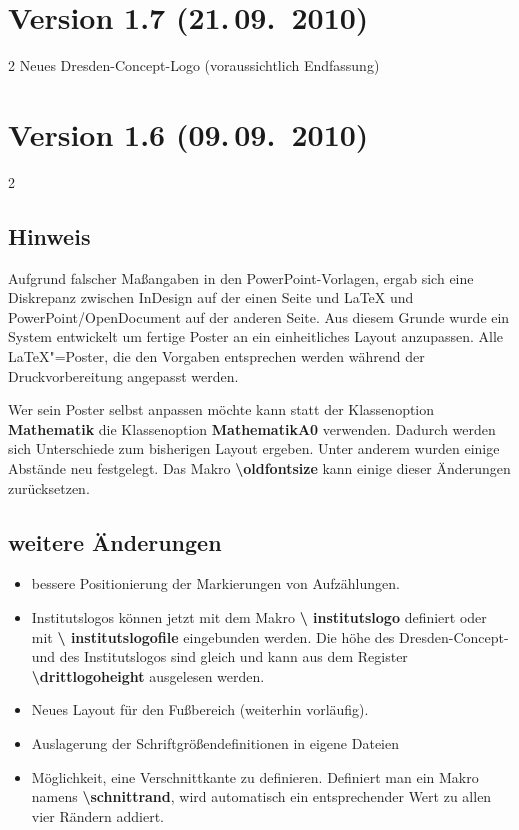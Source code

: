 \documentclass[serifmath,a0paper,noDIN,MathematikA0]{tudmathposter}
\begin{document}
\section{Version 1.7 (21.\,09.~2010)}
\begin{multicols}2
Neues Dresden-Concept-Logo (voraussichtlich Endfassung)
\end{multicols}
\section{Version 1.6 (09.\,09.~2010)}
\begin{multicols}2
\subsection{\textcolor{HKS07K100}{Hinweis}}
Aufgrund falscher Maßangaben in den PowerPoint-Vorlagen, ergab sich
eine Diskrepanz zwischen InDesign auf der einen Seite und \LaTeX{} und
PowerPoint/OpenDocument auf der anderen Seite. Aus diesem Grunde wurde
ein System entwickelt um fertige Poster an ein einheitliches Layout
anzupassen. Alle \LaTeX{}"=Poster, die den Vorgaben entsprechen werden
während der Druckvorbereitung angepasst werden.

Wer sein Poster selbst anpassen möchte kann statt der Klassenoption
\textbf{Mathematik} die Klassenoption \textbf{MathematikA0}
verwenden. Dadurch werden sich Unterschiede zum bisherigen Layout
ergeben. Unter anderem wurden einige Abstände neu festgelegt. Das
Makro \textbf{\textbackslash oldfontsize} kann einige dieser
Änderungen zurücksetzen.

\subsection{weitere Änderungen}
\begin{itemize}
\item bessere Positionierung der Markierungen von Aufzählungen.
\item Institutslogos können jetzt mit dem Makro \textbf{\textbackslash
    institutslogo} definiert oder mit \textbf{\textbackslash
    institutslogofile} eingebunden werden. Die höhe des
  Dresden-Concept- und des Institutslogos sind gleich und kann aus dem
  Register \textbf{\textbackslash drittlogoheight} ausgelesen werden.
\item Neues Layout für den Fußbereich (weiterhin vorläufig).
\item Auslagerung der Schriftgrößendefinitionen in eigene Dateien
\item Möglichkeit, eine Verschnittkante zu definieren. Definiert man
  ein Makro namens \textbf{\textbackslash schnittrand}, wird
  automatisch ein entsprechender Wert zu allen vier Rändern addiert. 
\end{itemize}
\end{multicols}
\end{document}
